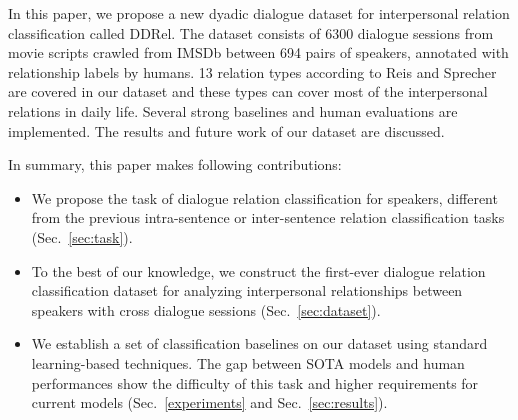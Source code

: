 In this paper, we propose a new dyadic dialogue dataset for 
interpersonal relation classification called DDRel. 
The dataset consists of 6300 dialogue sessions from movie scripts crawled 
from IMSDb between 694 pairs of speakers, annotated with relationship labels 
by humans. 13 relation types according to 
Reis and Sprecher~\cite{reis2009encyclopedia} are covered in our dataset and these types can cover most of the interpersonal relations in daily life. 
Several strong baselines and human evaluations are implemented. 
The results and future work of our dataset are discussed.

In summary, this paper makes following contributions:
\begin{itemize}
	\item We propose the task of dialogue relation classification for speakers, different from the previous intra-sentence or inter-sentence relation classification tasks (Sec.~\ref{sec:task}).
	\item To the best of our knowledge, we construct the first-ever dialogue relation classification dataset for analyzing interpersonal relationships between speakers with cross dialogue sessions (Sec.~\ref{sec:dataset}). %
	\item We establish a set of classification baselines on our dataset using standard learning-based techniques. The gap between SOTA models and human performances show the difficulty of this task and higher requirements for current models (Sec.~\ref{experiments} and Sec.~\ref{sec:results}).
\end{itemize}
